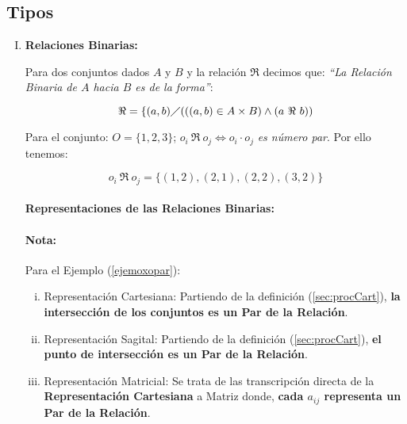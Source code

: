 \subsection{Tipos}

\begin{enumerate}[I.]

\item \textbf{Relaciones Binarias:}{

 Para dos conjuntos dados $A$ y $B$ y la relación $\Re$ decimos que: 
\textit{``La Relación Binaria de $A$ hacia $B$ es de la forma''}:

\begin{equation}
\Re = \{(a,b) \diagup (((a,b) \in A \times B) \wedge (a\ \Re\ b))
\end{equation}

\ejem Para el conjunto: $O=\{1,2,3\}$; $o_i\ \Re\ o_j \Leftrightarrow o_i \cdot 
o_j$ \textit{es número par}. Por ello tenemos:\label{ejemoxopar}

\begin{equation}
o_i\ \Re\ o_j = \{(1,2),(2,1),(2,2),(3,2)\}
\end{equation}

\paragraph*{Representaciones de las Relaciones Binarias:}
{
\paragraph*{Nota:} Para el Ejemplo (\ref{ejemoxopar}):

\begin{enumerate}[i.]

\item Representación Cartesiana: Partiendo de la definición 
(\ref{sec:procCart}), \textbf{la intersección de los conjuntos es un Par de la 
Relación}.

\item Representación Sagital: Partiendo de la definición (\ref{sec:procCart}), 
\textbf{el punto de intersección es un Par de la Relación}.

\item Representación Matricial: Se trata de las transcripción directa de la 
\textbf{Representación Cartesiana} a Matriz donde, \textbf{cada $a_{ij}$ 
representa un Par de la Relación}.

\begin{figure}[h]


\end{figure}
\end{enumerate}}}
\end{enumerate}
